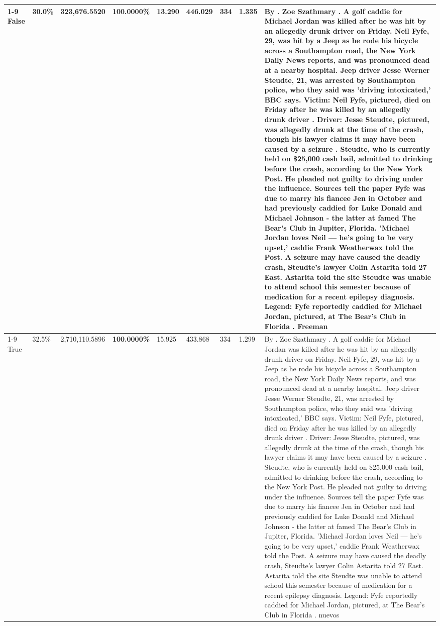 \begin{table}[H]
\begin{tabular}{lllrlllll}
\cline{1-9}
False & 30.0\% & 323,676.5520 & \bfseries \color{red} 100.0000\% & 13.290 & 446.029 & 334 & 1.335 & By . Zoe Szathmary . A golf caddie for Michael Jordan was killed after he was hit by an allegedly drunk driver on Friday. Neil Fyfe, 29, was hit by a Jeep as he rode his bicycle across a Southampton road, the New York Daily News reports, and was pronounced dead at a nearby hospital. Jeep driver Jesse Werner Steudte, 21, was arrested by Southampton police, who they said was 'driving intoxicated,' BBC says. Victim: Neil Fyfe, pictured, died on Friday after he was killed by an allegedly drunk driver . Driver: Jesse Steudte, pictured, was allegedly drunk at the time of the crash, though his lawyer claims it may have been caused by a seizure . Steudte, who is currently held on \$25,000 cash bail, admitted to drinking before the crash, according to the New York Post. He pleaded not guilty to driving under the influence. Sources tell the paper Fyfe was due to marry his fiancee Jen in October and had previously caddied for Luke Donald and Michael Johnson - the latter at famed The Bear's Club in Jupiter, Florida. 'Michael Jordan loves Neil — he’s going to be very upset,' caddie Frank Weatherwax told the Post. A seizure may have caused the deadly crash, Steudte's lawyer Colin Astarita told 27 East. Astarita told the site Steudte was unable to attend school this semester because of medication for a recent epilepsy diagnosis. Legend: Fyfe reportedly caddied for Michael Jordan, pictured, at The Bear's Club in Florida . Freeman \\
\cline{1-9}
True & 32.5\% & 2,710,110.5896 & \bfseries \color{red} 100.0000\% & 15.925 & 433.868 & 334 & 1.299 & By . Zoe Szathmary . A golf caddie for Michael Jordan was killed after he was hit by an allegedly drunk driver on Friday. Neil Fyfe, 29, was hit by a Jeep as he rode his bicycle across a Southampton road, the New York Daily News reports, and was pronounced dead at a nearby hospital. Jeep driver Jesse Werner Steudte, 21, was arrested by Southampton police, who they said was 'driving intoxicated,' BBC says. Victim: Neil Fyfe, pictured, died on Friday after he was killed by an allegedly drunk driver . Driver: Jesse Steudte, pictured, was allegedly drunk at the time of the crash, though his lawyer claims it may have been caused by a seizure . Steudte, who is currently held on \$25,000 cash bail, admitted to drinking before the crash, according to the New York Post. He pleaded not guilty to driving under the influence. Sources tell the paper Fyfe was due to marry his fiancee Jen in October and had previously caddied for Luke Donald and Michael Johnson - the latter at famed The Bear's Club in Jupiter, Florida. 'Michael Jordan loves Neil — he’s going to be very upset,' caddie Frank Weatherwax told the Post. A seizure may have caused the deadly crash, Steudte's lawyer Colin Astarita told 27 East. Astarita told the site Steudte was unable to attend school this semester because of medication for a recent epilepsy diagnosis. Legend: Fyfe reportedly caddied for Michael Jordan, pictured, at The Bear's Club in Florida . nuevos \\

\end{tabular}
\end{table}
